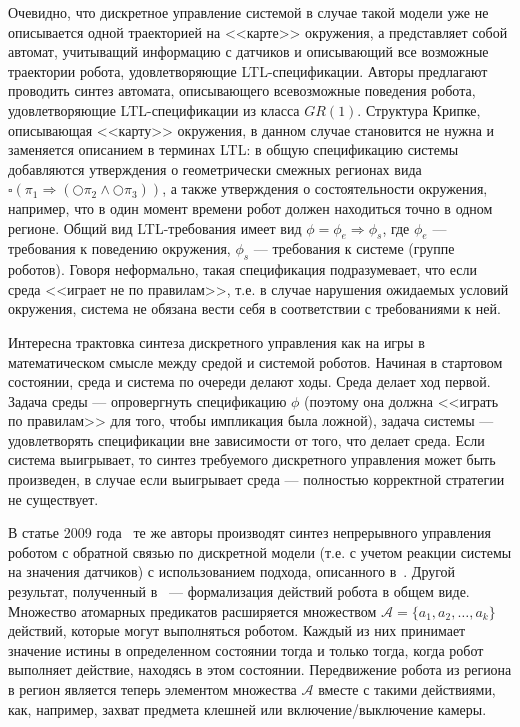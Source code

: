 \documentclass[conference]{IEEEtran}
\begin{document}
Очевидно, что дискретное управление системой в случае такой модели уже не 
описывается одной траекторией на <<карте>> окружения, а представляет собой автомат, 
учитыващий информацию с датчиков и описывающий все возможные траектории робота, удовлетворяющие LTL-спецификации. 
Авторы предлагают проводить синтез автомата, описывающего всевозможные поведения робота, 
удовлетворяющие LTL-спецификации из класса $GR(1)$. Структура Крипке, описывающая <<карту>> 
окружения, в данном случае становится не нужна и заменяется описанием в терминах 
LTL: в общую спецификацию системы добавляются утверждения о геометрически смежных 
регионах вида $\square(\pi_1\Rightarrow(\bigcirc\pi_2\wedge\bigcirc\pi_3))$, а также 
утверждения о состоятельности окружения, например, что в один момент времени робот должен 
находиться точно в одном регионе. Общий вид LTL-требования имеет вид $\phi=\phi_e\Rightarrow\phi_s$, 
где $\phi_e$ --- требования к поведению окружения, $\phi_s$ --- требования к 
системе (группе роботов). Говоря неформально, такая спецификация подразумевает, 
что если среда <<играет не по правилам>>, т.е. в случае нарушения ожидаемых 
условий окружения, система не обязана вести себя в соответствии с требованиями к ней.

Интересна трактовка синтеза дискретного управления как на игры в математическом смысле 
между средой и системой роботов. Начиная в стартовом состоянии, среда и система 
по очереди делают ходы. Среда делает ход первой. Задача среды --- опровергнуть 
спецификацию $\phi$ (поэтому она должна <<играть по правилам>> для того, чтобы 
импликация была ложной), задача системы --- удовлетворять спецификации вне 
зависимости от того, что делает среда. Если система выигрывает, то синтез 
требуемого дискретного управления может быть произведен, в случае если 
выигрывает среда --- полностью корректной стратегии не существует.

В статье 2009 года~\cite{kress2009temporal} те же авторы производят синтез непрерывного управления 
роботом с обратной связью по дискретной модели (т.е. с учетом реакции системы 
на значения датчиков) с использованием подхода, описанного в~\cite{conner2003composition}. 
Другой результат, полученный в~\cite{kress2009temporal} --- формализация действий 
робота в общем виде. Множество атомарных предикатов расширяется множеством 
$\mathcal{A}=\{a_1,a_2,\dots,a_k\}$ действий, которые могут выполняться роботом. Каждый 
из них принимает значение истины в определенном состоянии тогда и только тогда, 
когда робот выполняет действие, находясь в этом состоянии. Передвижение робота 
из региона в регион является теперь элементом множества $\mathcal{A}$ вместе с такими 
действиями, как, например, захват предмета клешней или включение/выключение камеры.
\end{document}
